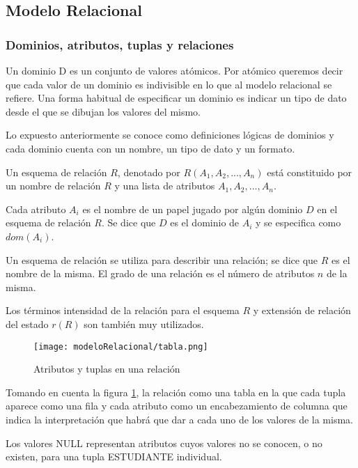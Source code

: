 \subsection{Modelo Relacional}


\subsubsection{Dominios, atributos, tuplas y relaciones}

Un dominio D es un conjunto de valores atómicos. Por atómico queremos decir que cada valor de un dominio es indivisible en lo que al modelo relacional se refiere. Una forma habitual de especificar un dominio es indicar un tipo de dato desde el que se dibujan los valores del mismo.


Lo expuesto anteriormente se conoce como definiciones lógicas de dominios y cada dominio cuenta con un nombre, un tipo de dato y un formato.


Un esquema de relación $R$, denotado por $R(A_1, A_2,..., A_n)$ está constituido por un nombre de relación $R$ y una lista de atributos $A_1, A_2,..., A_n$. 


Cada atributo $A_i$ es el nombre de un papel jugado por algún dominio $D$ en el esquema de relación $R$. Se dice que $D$ es el dominio de $A_i$ y se especifica como $dom(A_i)$. 


Un esquema de relación se utiliza para describir una relación; se dice que $R$ es el nombre de la misma. El grado de una relación es el número de atributos $n$ de la misma.




Los términos intensidad de la relación para el esquema $R$ y extensión de relación del estado $r(R)$ son también muy utilizados.


\begin{figure}[ht]
    \centering
    \texttt{[image: modeloRelacional/tabla.png]}
    \caption{Atributos y tuplas en una relación}
    \label{img:modeloRelacional-Tabla}
\end{figure} 


Tomando en cuenta la figura \ref{img:modeloRelacional-Tabla}, la relación como una tabla en la que cada tupla aparece como una fila y cada atributo como un encabezamiento de columna que indica la interpretación que habrá que dar a cada uno de los valores de la misma.


Los valores NULL representan atributos cuyos valores no se conocen, o no existen, para una tupla ESTUDIANTE individual.


